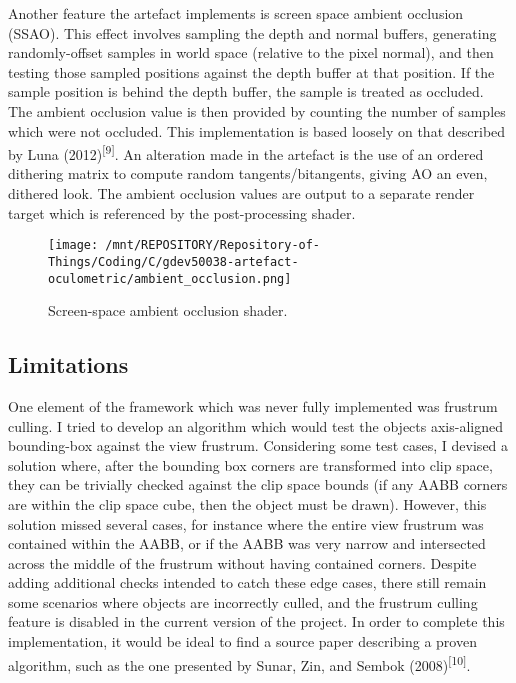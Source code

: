 \documentclass[
]{article}
\begin{document}
{Another feature the artefact implements is screen space ambient
occlusion (SSAO). This effect involves sampling the depth and normal
buffers, generating randomly-offset samples in world space (relative to
the pixel normal), and then testing those sampled positions against the
depth buffer at that position. If the sample position is behind the
depth buffer, the sample is treated as occluded. The ambient occlusion
value is then provided by counting the number of samples which were not
occluded. This implementation is based loosely on that described by Luna
(2012)\textsuperscript{{[}9{]}}. An alteration made in the artefact is
the use of an ordered dithering matrix to compute random tangents/bitangents,
giving AO an even, dithered look. The ambient occlusion values are
output to a separate render target which is referenced by the
post-processing shader.\\
\begin{figure}[H]
\texttt{[image: /mnt/REPOSITORY/Repository-of-Things/Coding/C/gdev50038-artefact-oculometric/ambient\_occlusion.png]}
\caption{\label{fig:figure3} Screen-space ambient occlusion shader.}
\end{figure}

\hypertarget{limitations}{%
\subsection{Limitations}\label{limitations}}

One element of the framework which was never fully implemented was
frustrum culling. I tried to develop an algorithm which would test the
object\textquotesingle s axis-aligned bounding-box against the view
frustrum. Considering some test cases, I devised a solution where, after
the bounding box corners are transformed into clip space, they can be
trivially checked against the clip space bounds (if any AABB corners are
within the clip space cube, then the object must be drawn). However,
this solution missed several cases, for instance where the entire view
frustrum was contained within the AABB, or if the AABB was very narrow
and intersected across the middle of the frustrum without having
contained corners. Despite adding additional checks intended to catch
these edge cases, there still remain some scenarios where objects are
incorrectly culled, and the frustrum culling feature is disabled in the
current version of the project. In order to complete this
implementation, it would be ideal to find a source paper describing a
proven algorithm, such as the one presented by Sunar, Zin, and Sembok
(2008)\textsuperscript{{[}10{]}}.

}
\end{document}
